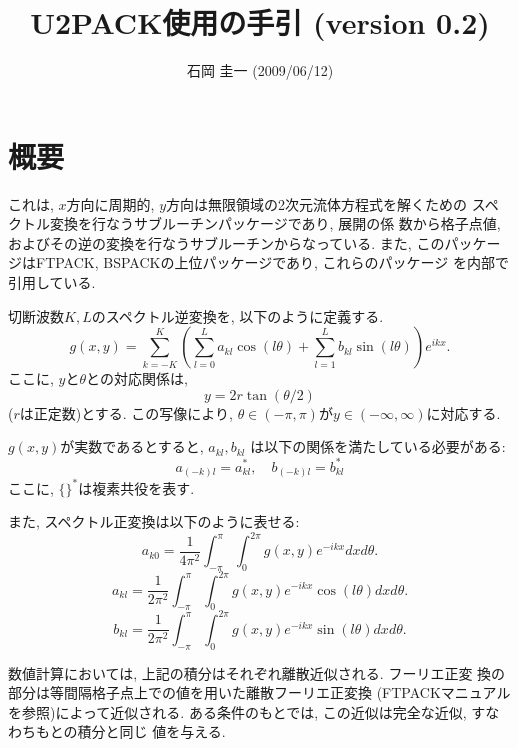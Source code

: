 \documentclass[a4j,fleqn]{jarticle}
\title{U2PACK使用の手引 (version 0.2)}
\author{石岡 圭一  (2009/06/12)}
\date{}
\begin{document}
\maketitle

\section{概要}

これは, $x$方向に周期的, $y$方向は無限領域の2次元流体方程式を解くための
スペクトル変換を行なうサブルーチンパッケージであり, 展開の係
数から格子点値, およびその逆の変換を行なうサブルーチンからなっている. 
また, このパッケージはFTPACK, BSPACKの上位パッケージであり, これらのパッケージ
を内部で引用している.

切断波数$K,L$のスペクトル逆変換を, 以下のように定義する.
\begin{equation}
g(x,y)=\sum^K_{k=-K}\left(
\sum^L_{l=0}a_{kl}\cos(l\theta)
+\sum^L_{l=1}b_{kl}\sin(l\theta)\right)
e^{ikx}.
\end{equation}
ここに, $y$と$\theta$との対応関係は,
\begin{equation}
y=2r\tan(\theta/2)
\end{equation}
($r$は正定数)とする. この写像により,
$\theta\in(-\pi,\pi)$が$y\in(-\infty,\infty)$に対応する.

$g(x,y)$が実数であるとすると, $a_{kl},b_{kl}$
は以下の関係を満たしている必要がある:
\begin{equation}
a_{(-k)l}=a_{kl}^{*}, \quad b_{(-k)l}=b_{kl}^{*}
\end{equation}
ここに, $\{ \}^{*}$は複素共役を表す.

また, スペクトル正変換は以下のように表せる:
\begin{equation}
a_{k0}=\frac1{4\pi^2}\int^{\pi}_{-\pi}\int^{2\pi}_0
g(x,y)e^{-ikx}dxd\theta.
\end{equation}
\begin{equation}
a_{kl}=\frac1{2\pi^2}\int^{\pi}_{-\pi}\int^{2\pi}_0
g(x,y)e^{-ikx}\cos(l\theta)dxd\theta.
\end{equation}
\begin{equation}
b_{kl}=\frac1{2\pi^2}\int^{\pi}_{-\pi}\int^{2\pi}_0
g(x,y)e^{-ikx}\sin(l\theta)dxd\theta.
\end{equation}

数値計算においては, 上記の積分はそれぞれ離散近似される. フーリエ正変
換の部分は等間隔格子点上での値を用いた離散フーリエ正変換
(FTPACKマニュアルを参照)によって近似される.
ある条件のもとでは, この近似は完全な近似, すなわちもとの積分と同じ
値を与える.
\end{document}
